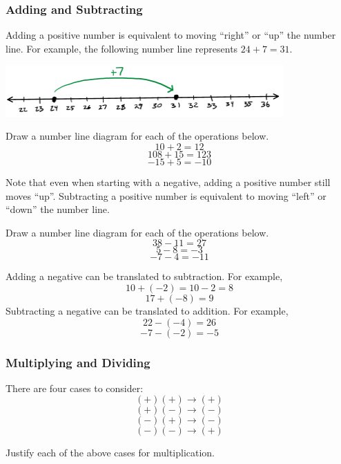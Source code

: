 \subsubsection{Adding and Subtracting} 
Adding a positive number is equivalent to moving ``right'' or ``up'' the number line.  
For example, the following number line represents \(24 + 7 = 31\).
\begin{center}
	\includegraphics[width=0.8\textwidth]{img/numberline.png}
\end{center}
\begin{exercise}
Draw a number line diagram for each of the operations below. 
	\[10 + 2 = 12  \]
	\[ 108 + 15 = 123  \]
	\[  -15 + 5 = -10   \]
\end{exercise}
\noindent	
Note that even when starting with a negative, adding a positive number still moves ``up''. 
Subtracting a positive number is equivalent to moving ``left'' or ``down'' the number line. 
\begin{exercise}
	Draw a number line diagram for each of the operations below. 
	\[ 38 - 11 = 27 \]
	\[  5-8 = -3  \]
	\[  -7 - 4 = -11   \]
\end{exercise}
\noindent
Adding a negative can be translated to subtraction.  For example, 
\[10 + (-2) = 10 -2 = 8 \]
\[  17 + (-8) = 9 \]
Subtracting a negative can be translated to addition.  For example, 
\[  22 - (-4) = 26 \]
\[ -7 - (-2) = -5 \]


\newpage 
\subsubsection{Multiplying and Dividing} 
There are four cases to consider: 
\[ (+)(+) \to (+)  \]
\[ (+)(-) \to (-)  \]
\[ (-)(+) \to (-)  \]
\[ (-)(-) \to (+)  \]

\begin{exercise}
Justify each of the above cases for multiplication.  %

\end{exercise}


